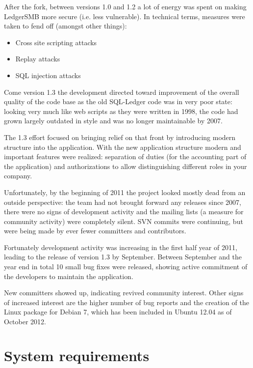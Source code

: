 After the fork, between versions 1.0 and 1.2 a lot of energy was spent on
making LedgerSMB more secure (i.e. less vulnerable).  In technical terms,
measures were taken to fend off (amongst other things):

\begin{itemize}
\item Cross site scripting attacks
\item Replay attacks
\item SQL injection attacks
\end{itemize}

Come version 1.3 the development directed toward improvement of the overall
quality of the code base as the old SQL-Ledger code was in very poor state:
looking very much like web scripts as they were written in 1998, the code had
grown largely outdated in style and was no longer maintainable by 2007.

The 1.3 effort focused on bringing relief on that front by introducing
modern structure into the application.  With the new application structure
modern and important features were realized: separation of duties (for the
accounting part of the application) and authorizations to allow distinguishing
different roles in your company.

Unfortunately, by the beginning of 2011 the project looked mostly dead from
an outside perspective: the team had not brought forward any releases since
2007, there were no signs of development activity and the
mailing lists (a measure for community activity) were
completely silent.  SVN commits were continuing, but were being made by ever
fewer committers and contributors.

Fortunately development activity was increasing in the first half
year of 2011,
leading to the release of version 1.3 by September.  Between September and the
year end in total 10 small bug fixes were released, showing active commitment
of the developers to maintain the application.

New committers showed up, indicating revived community interest. Other signs of
increased interest are the higher number of bug reports and the creation of the
Linux package for Debian 7, which has been included in Ubuntu 12.04 as of
October 2012.



\section{System requirements}
\label{sec-ledgersmb-system-requirements}

